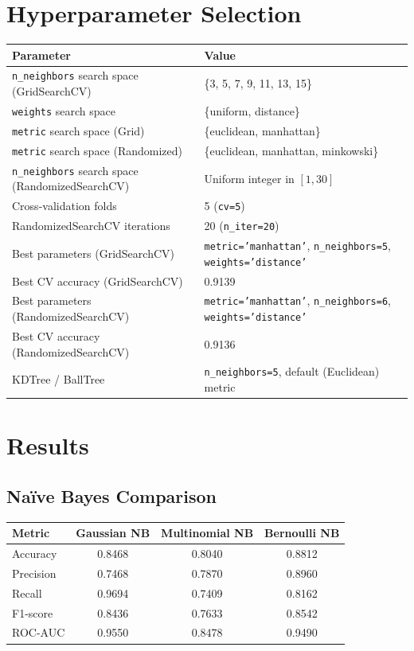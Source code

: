 \documentclass[12pt,a4paper]{article}
\begin{document}
\section{Hyperparameter Selection}
\begin{tabular}{ll}
\toprule
Parameter & Value\\
\midrule
\texttt{n\_neighbors} search space (GridSearchCV) & \{3, 5, 7, 9, 11, 13, 15\} \\
\texttt{weights} search space & \{uniform, distance\} \\
\texttt{metric} search space (Grid) & \{euclidean, manhattan\} \\
\texttt{metric} search space (Randomized) & \{euclidean, manhattan, minkowski\} \\
\texttt{n\_neighbors} search space (RandomizedSearchCV) & Uniform integer in $[1, 30]$ \\
Cross-validation folds & 5 (\texttt{cv=5}) \\
RandomizedSearchCV iterations & 20 (\texttt{n\_iter=20}) \\
Best parameters (GridSearchCV) & \texttt{metric='manhattan'}, \texttt{n\_neighbors=5}, \texttt{weights='distance'} \\
Best CV accuracy (GridSearchCV) & 0.9139 \\
Best parameters (RandomizedSearchCV) & \texttt{metric='manhattan'}, \texttt{n\_neighbors=6}, \texttt{weights='distance'} \\
Best CV accuracy (RandomizedSearchCV) & 0.9136 \\
KDTree / BallTree & \texttt{n\_neighbors=5}, default (Euclidean) metric \\
\bottomrule
\end{tabular}

\section{Results}

\subsection*{Na\"ive Bayes Comparison}
\begin{tabular}{lccc}
\toprule
Metric & Gaussian NB & Multinomial NB & Bernoulli NB \\
\midrule
Accuracy & 0.8468 & 0.8040 & 0.8812 \\
Precision & 0.7468 & 0.7870 & 0.8960 \\
Recall & 0.9694 & 0.7409 & 0.8162 \\
F1-score & 0.8436 & 0.7633 & 0.8542 \\
ROC-AUC & 0.9550 & 0.8478 & 0.9490 \\
\bottomrule
\end{tabular}
\end{document}
